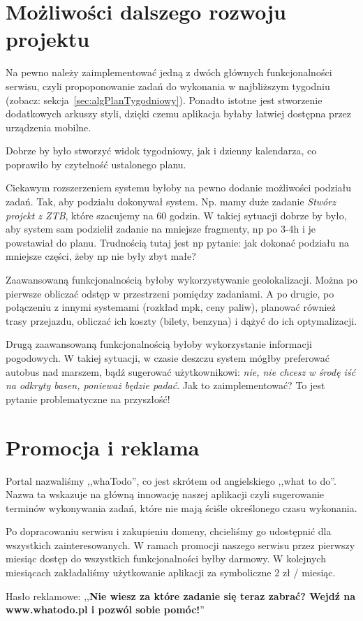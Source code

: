 \documentclass[pdflatex,11pt]{aghdpl}
\begin{document}
\section{Możliwości dalszego rozwoju projektu}

Na pewno należy zaimplementować jedną z dwóch głównych funkcjonalności serwisu, czyli propoponowanie zadań do wykonania w najbliższym tygodniu (zobacz: sekcja~\ref{sec:algPlanTygodniowy}). Ponadto istotne jest stworzenie dodatkowych arkuszy styli, dzięki czemu aplikacja byłaby łatwiej dostępna przez urządzenia mobilne.

Dobrze by było stworzyć widok tygodniowy, jak i dzienny kalendarza, co poprawiło by czytelność ustalonego planu.

Ciekawym rozszerzeniem systemu byłoby na pewno dodanie możliwości podziału zadań. Tak, aby podziału dokonywał system. Np. mamy duże zadanie \textit{Stwórz projekt z ZTB}, które szacujemy na 60 godzin. W takiej sytuacji dobrze by było, aby system sam podzielił zadanie na mniejsze fragmenty, np po 3-4h i je powstawiał do planu. Trudnością tutaj jest np pytanie: jak dokonać podziału na mniejsze części, żeby np nie były zbyt małe?

Zaawansowaną funkcjonalnością byłoby wykorzystywanie geolokalizacji. Można po pierwsze obliczać odstęp w przestrzeni pomiędzy zadaniami. A po drugie, po połączeniu z innymi systemami (rozkład mpk, ceny paliw), planować również trasy przejazdu, obliczać ich koszty (bilety, benzyna) i dążyć do ich optymalizacji.

Drugą zaawansowaną funkcjonalnością byłoby wykorzystanie informacji pogodowych. W takiej sytuacji, w czasie deszczu system mógłby preferować autobus nad marszem, bądź sugerować użytkownikowi: \textit{nie, nie chcesz w środę iść na odkryty basen, ponieważ będzie padać}. Jak to zaimplementować? To jest pytanie problematyczne na przyszłość!

\section{Promocja i reklama}

Portal nazwaliśmy ,,whaTodo'', co jest skrótem od angielskiego ,,what to do''. Nazwa ta wskazuje na główną innowację naszej aplikacji czyli sugerowanie terminów wykonywania zadań, które nie mają ściśle określonego czasu wykonania.

Po dopracowaniu serwisu i zakupieniu domeny, chcieliśmy go udostępnić dla wszystkich zainteresowanych. W ramach promocji naszego serwisu przez pierwszy miesiąc dostęp do wszystkich funkcjonalności byłby darmowy. W kolejnych miesiącach zakładaliśmy użytkowanie aplikacji za symboliczne 2 zł / miesiąc.

Hasło reklamowe: ,,\textbf{Nie wiesz za które zadanie się teraz zabrać? Wejdź na www.whatodo.pl i pozwól sobie
pomóc!}''
\end{document}
